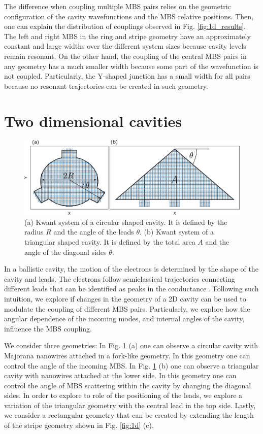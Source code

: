 The difference when coupling multiple MBS pairs relies on the geometric configuration of the cavity wavefunctions and the MBS relative positions.
Then, one can explain the distribution of couplings observed in Fig. \ref{fig:1d_results}.
The left and right MBS in the ring and stripe geometry have an approximately constant and large widths over the different system sizes because cavity levels remain resonant.
On the other hand, the coupling of the central MBS pairs in any geometry has a much smaller width because some part of the wavefunction is not coupled.
Particularly, the Y-shaped junction has a small width for all pairs because no resonant trajectories can be created in such geometry.

\section{Two dimensional cavities}

\begin{figure}[h!]
\centering
  \includegraphics[width=0.9\linewidth]{figures/2d_cavities.pdf}
  \caption{(a) Kwant system of a circular shaped cavity. It is defined by the radius $R$ and the angle of the leads $\theta$. (b) Kwant system of a triangular shaped cavity. It is defined by the total area $A$ and the angle of the diagonal sides $\theta$.}
  \label{fig:2d}
\end{figure}

In a ballistic cavity, the motion of the electrons is determined by the shape of the cavity and leads.
The electrons follow semiclassical trajectories connecting different leads that can be identified as peaks in the conductance \cite{Wirtz1997}.
Following such intuition, we explore if changes in the geometry of a 2D cavity can be used to modulate the coupling of different MBS pairs.
Particularly, we explore how the angular dependence of the incoming modes, and internal angles of the cavity, influence the MBS coupling.

We consider three geometries:
In Fig. \ref{fig:2d} (a) one can observe a circular cavity with Majorana nanowires attached in a fork-like geometry.
In this geometry one can control the angle of the incoming MBS.
In Fig. \ref{fig:2d} (b) one can observe a triangular cavity with nanowires attached at the lower side.
In this geometry one can control the angle of MBS scattering within the cavity by changing the diagonal sides.
In order to explore to role of the positioning of the leads, we explore a variation of the triangular geometry with the central lead in the top side.
Lastly, we consider a rectangular geometry that can be created by extending the length of the stripe geometry shown in Fig. \ref{fig:1d} (c).


